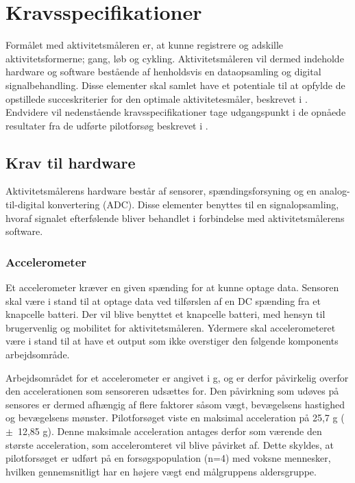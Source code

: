 \section{Kravsspecifikationer}
Formålet med aktivitetsmåleren er, at kunne registrere og adskille aktivitetsformerne; gang, løb og cykling. Aktivitetsmåleren vil dermed indeholde hardware og software bestående af henholdsvis en dataopsamling og digital signalbehandling. Disse elementer skal samlet have et potentiale til at opfylde de opstillede succeskriterier for den optimale aktivitetesmåler, beskrevet i . \newline
Endvidere vil nedenstående kravsspecifikationer tage udgangspunkt i de opnåede resultater fra de udførte pilotforsøg beskrevet i  .

\subsection{Krav til hardware}
Aktivitetsmålerens hardware består af sensorer, spændingsforsyning og en analog-til-digital konvertering (ADC). Disse elementer benyttes til en signalopsamling, hvoraf signalet efterfølende bliver behandlet i forbindelse med aktivitetsmålerens software.

\subsubsection{Accelerometer}
Et accelerometer kræver en given spænding for at kunne optage data. Sensoren skal være i stand til at optage data ved tilførslen af en DC spænding fra et knapcelle batteri. Der vil blive benyttet et knapcelle batteri, med hensyn til brugervenlig og mobilitet for aktivitetsmåleren.\newline
Ydermere skal accelerometeret være i stand til at have et output som ikke overstiger den følgende komponents arbejdsområde.  

Arbejdsområdet for et accelerometer er angivet i g, og er derfor påvirkelig overfor den accelerationen som sensoreren udsættes for. Den påvirkning som udøves på sensores er dermed afhængig af flere faktorer såsom vægt, bevægelsens hastighed og bevægelsens mønster. \newline
Pilotforsøget viste en maksimal acceleration på 25,7 g ($\pm$~12,85 g). Denne maksimale acceleration antages derfor som værende den største acceleration, som acceleromteret vil blive påvirket af. Dette skyldes, at pilotforsøget er udført på en forsøgspopulation (n=4) med voksne mennesker, hvilken gennemsnitligt har en højere vægt end målgruppens aldersgruppe. 



